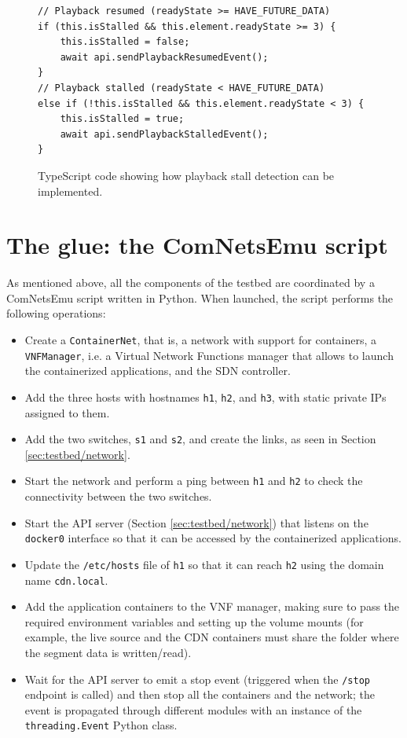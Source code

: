 \begin{figure}
    \centering
    \begin{verbatim}
// Playback resumed (readyState >= HAVE_FUTURE_DATA)
if (this.isStalled && this.element.readyState >= 3) {
    this.isStalled = false;
    await api.sendPlaybackResumedEvent();
}
// Playback stalled (readyState < HAVE_FUTURE_DATA)
else if (!this.isStalled && this.element.readyState < 3) {
    this.isStalled = true;
    await api.sendPlaybackStalledEvent();
}
    \end{verbatim}
    \caption{TypeScript code showing how playback stall detection can be implemented.}
    \label{fig:hls_readystate}
\end{figure}

\section{The glue: the ComNetsEmu script}
\label{sec:testbed/script}

As mentioned above, all the components of the testbed are coordinated by a ComNetsEmu script written in Python. When launched, the script performs the following operations:

\begin{itemize}
    \item Create a \texttt{ContainerNet}, that is, a network with support for containers, a \texttt{VNFManager}, i.e. a Virtual Network Functions manager that allows to launch the containerized applications, and the SDN controller.
    \item Add the three hosts with hostnames \texttt{h1}, \texttt{h2}, and \texttt{h3}, with static private IPs assigned to them.
    \item Add the two switches, \texttt{s1} and \texttt{s2}, and create the links, as seen in Section \ref{sec:testbed/network}.
    \item Start the network and perform a ping between \texttt{h1} and \texttt{h2} to check the connectivity between the two switches.
    \item Start the API server (Section \ref{sec:testbed/network}) that listens on the \texttt{docker0} interface so that it can be accessed by the containerized applications.
    \item Update the \texttt{/etc/hosts} file of \texttt{h1} so that it can reach \texttt{h2} using the domain name \texttt{cdn.local}.
    \item Add the application containers to the VNF manager, making sure to pass the required environment variables and setting up the volume mounts (for example, the live source and the CDN containers must share the folder where the segment data is written/read).
    \item Wait for the API server to emit a stop event (triggered when the \texttt{/stop} endpoint is called) and then stop all the containers and the network; the event is propagated through different modules with an instance of the \texttt{threading.Event} Python class.
\end{itemize}

